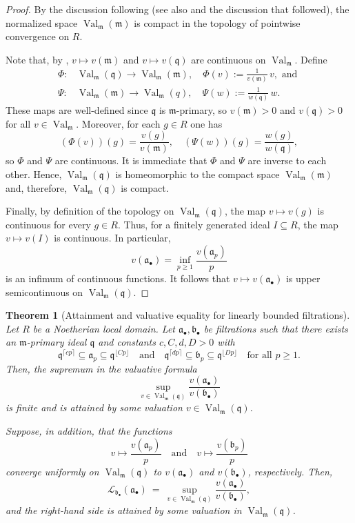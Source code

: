 \documentclass[12pt]{amsart}
\newcommand{\m}{\mathfrak m}
\newcommand{\q}{\mathfrak q}
\renewcommand{\a}{\mathfrak{a}}
\renewcommand{\b}{\mathfrak{b}}
\newcommand{\Loj}{\mathcal{L}} %
\DeclareMathOperator{\Val}{Val}
\newcommand{\abul}{{\a_\bullet}}
\newcommand{\bbul}{{\b_\bullet}}
\theoremstyle{plain}
\newtheorem{theorem}{Theorem}[section]
\theoremstyle{definition}
\numberwithin{equation}{section}
\begin{document}
\begin{proof}
By the discussion following \cite[Definition~1.3]{BFJ2008} (see also \cite[Proposition 5.9]{JM12} and the discussion that followed), the normalized space $\Val_{\m}(\m)$
is compact in the topology of pointwise convergence on $R$.

Note that,  by \cite[Lemma 4.1]{JM12}, $v\mapsto v(\m)$ and $v\mapsto v(\q)$ are continuous on $\Val_{\m}$.
Define
\begin{align*}
\Phi: & \Val_{\m}(\q)\longrightarrow \Val_{\m}(\m),\quad \Phi(v):=\frac{1}{v(\m)}\,v, \text{ and } \\
\Psi: & \Val_{\m}(\m)\longrightarrow \Val_{\m}(q),\quad \Psi(w):=\frac{1}{w(\q)}\,w.
\end{align*}
These maps are well-defined since $\q$ is $\m$-primary, so $v(\m)>0$ and $v(\q)>0$ for
all $v\in\Val_{\m}$. Moreover, for each $g\in R$ one has
\[
(\Phi(v))(g)=\frac{v(g)}{v(\m)},\quad (\Psi(w))(g)=\frac{w(g)}{w(\q)},
\]
so $\Phi$ and $\Psi$ are continuous. It is immediate that $\Phi$ and $\Psi$ are inverse
to each other. Hence, $\Val_{\m}(\q)$ is homeomorphic to the compact space $\Val_{\m}(\m)$
and, therefore, $\Val_{\m}(\q)$ is compact.

Finally, by definition of the topology on $\Val_{\m}(\q)$, the map $v\mapsto v(g)$ is
continuous for every $g\in R$. Thus, for a finitely generated ideal $I\subseteq R$, the map
$v\mapsto v(I)$ is continuous. In particular,
\[
v(\a_\bullet)=\inf_{p\ge 1}\frac{v(\a_p)}{p}
\]
is an infimum of continuous functions. It follows that $v\mapsto v(\a_\bullet)$ is upper
semicontinuous on $\Val_{\m}(\q)$.
\end{proof}


\begin{theorem}[Attainment and valuative equality for linearly bounded filtrations]
\label{thm:attainment}
	Let $R$ be a Noetherian local domain.
	Let $\abul,\bbul$ be filtrations such that there exists an $\m$-primary ideal
	$\q$ and constants $c,C,d,D>0$ with
	\[
	\q^{\lceil cp\rceil}\subseteq \a_p\subseteq \q^{\lfloor Cp\rfloor}
	\quad\text{and}\quad
	\q^{\lceil dp\rceil}\subseteq \b_p\subseteq \q^{\lfloor Dp\rfloor}
	\quad\text{for all }p\ge1.
	\]
	Then, the supremum in the valuative formula
	\[
	\sup_{v\in\Val_{\m}(\q)}\frac{v(\abul)}{v(\bbul)}
	\]
	is finite and is attained by some valuation $v\in\Val_{\m}(\q)$.

	Suppose, in addition, that the functions
	\[
	v\longmapsto \frac{v(\a_p)}{p}
	\quad\text{and}\quad
	v\longmapsto \frac{v(\b_p)}{p}
	\]
	converge \emph{uniformly} on $\Val_{\m}(\q)$ to
	$v(\abul)$ and $v(\bbul)$, respectively.
	Then,
	\[
	\Loj_{\bbul}(\abul)
	\ =\
	\sup_{v\in\Val_{\m}(\q)}\frac{v(\abul)}{v(\bbul)},
	\]
	and the right-hand side is attained by some valuation in $\Val_{\m}(\q)$.
\end{theorem}
\end{document}

